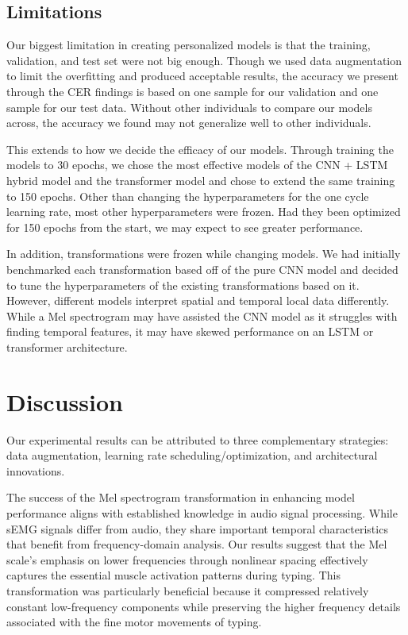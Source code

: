 \documentclass{article}
\begin{document}
\subsection{Limitations}
Our biggest limitation in creating personalized models is that the training, validation, and test set were not big enough. Though we used data augmentation to limit the overfitting and produced acceptable results, the accuracy we present through the CER findings is based on one sample for our validation and one sample for our test data. Without other individuals to compare our models across, the accuracy we found may not generalize well to other individuals.

This extends to how we decide the efficacy of our models. Through training the models to 30 epochs, we chose the most effective models of the CNN + LSTM hybrid model and the transformer model and chose to extend the same training to 150 epochs. Other than changing the hyperparameters for the one cycle learning rate, most other hyperparameters were frozen. Had they been optimized for 150 epochs from the start, we may expect to see greater performance.

In addition, transformations were frozen while changing models. We had initially benchmarked each transformation based off of the pure CNN model and decided to tune the hyperparameters of the existing transformations based on it. However, different models interpret spatial and temporal local data differently. While a Mel spectrogram may have assisted the CNN model as it struggles with finding temporal features, it may have skewed performance on an LSTM or transformer architecture.

\section{Discussion}
Our experimental results can be attributed to three complementary strategies: data augmentation, learning rate scheduling/optimization, and architectural innovations.

The success of the Mel spectrogram transformation in enhancing model performance aligns with established knowledge in audio signal processing. While sEMG signals differ from audio, they share important temporal characteristics that benefit from frequency-domain analysis. Our results suggest that the Mel scale's emphasis on lower frequencies through nonlinear spacing effectively captures the essential muscle activation patterns during typing. This transformation was particularly beneficial because it compressed relatively constant low-frequency components while preserving the higher frequency details associated with the fine motor movements of typing.
\end{document}
